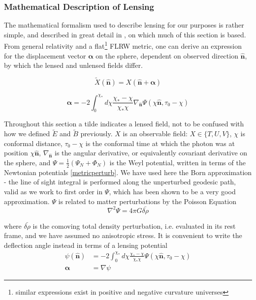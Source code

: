 \documentclass[a4paper,10pt]{article}
\renewcommand{\v}[1]{\mathbf{#1}}
\newcommand{\half}{\frac{1}{2}}
\newcommand{\unit}[1]{\hat{\v{#1}}}
\begin{document}
\subsubsection{Mathematical Description of Lensing}

The mathematical formalism used to describe lensing for our purposes is rather simple, and described in great detail in \cite{lewis}, on which much of this section is based. From general relativity and a flat\footnote{similar expressions exist in positive and negative curvature universes} FLRW metric, one can derive an expression for the displacement vector $\v{\alpha}$ on the sphere, dependent on observed direction $\unit{n}$, by which the lensed and unlensed fields differ. 

\begin{equation}
\tilde{X}(\unit{n}) = X(\unit{n}+\v{\alpha})
\end{equation}

\begin{equation}
\v{\alpha} = -2 \int_0^{\chi_*}d\chi \frac{\chi_*-\chi}{\chi_*\chi}\nabla_{\unit{n}}\Psi(\chi\unit{n},\tau_0-\chi)
\end{equation}

Throughout this section a tilde indicates a lensed field, not to be confused with how we defined $\tilde{E}$ and $\tilde{B}$ previously. $X$ is an observable field: $X \in \{ T, U, V\}$, $\chi$ is conformal distance, $\tau_0-\chi$ is the conformal time at which the photon was at position $\chi\unit{n}$, $\nabla_{\unit{n}}$ is the angular derivative, or equivalently covariant derivative on the sphere, and $\Psi=\half(\Psi_N+\Phi_N)$ is the Weyl potential, written in terms of the Newtonian potentials \ref{metricperturb}. We have used here the Born approximation - the line of sight integral is performed along the unperturbed geodesic path, valid as we work to first order in $\Psi$, which has been shown to be a very good approximation. $\Psi$ is related to matter perturbations by the Poisson Equation
\begin{equation}
\nabla^2\Psi = 4\pi G\bar{\delta\rho}
\label{poisson}
\end{equation}

where $\bar{\delta\rho}$ is the comoving total density perturbation, i.e. evaluated in its rest frame, and we have assumed no anisotropic stress. It is convenient to write the deflection angle instead in terms of a lensing potential
\begin{equation}\begin{split}
\psi(\unit{n}) &= -2 \int_0^{\chi_*}d\chi \frac{\chi_*-\chi}{\chi_*\chi}\Psi(\chi\unit{n},\tau_0-\chi)\\
\v{\alpha} &= \nabla \psi
\end{split}\end{equation}
\end{document}
